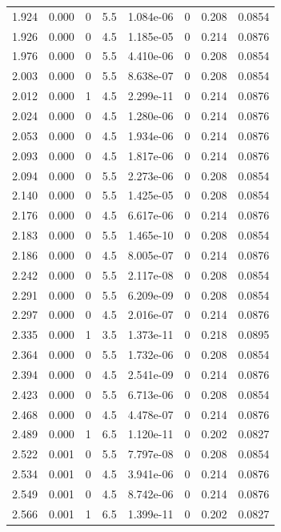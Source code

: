 \documentclass[preview]{standalone}
\begin{document}
{{{\begin{tabular}{L{1.2cm}C{1.2cm} C{0.3cm}C{0.5cm} C{1.4cm}C{1.4cm} C{1.4cm}C{1.4cm}}
  1.924  &  0.000  & 0     & 5.5 &  1.084e-06  & 0  & 0.208 &  0.0854   \\ 
  1.926  &  0.000  & 0     & 4.5 &  1.185e-05  & 0  & 0.214 &  0.0876   \\ 
  1.976  &  0.000  & 0     & 5.5 &  4.410e-06  & 0  & 0.208 &  0.0854   \\ 
  2.003  &  0.000  & 0     & 5.5 &  8.638e-07  & 0  & 0.208 &  0.0854   \\ 
  2.012  &  0.000  & 1     & 4.5 &  2.299e-11  & 0  & 0.214 &  0.0876   \\ 
  2.024  &  0.000  & 0     & 4.5 &  1.280e-06  & 0  & 0.214 &  0.0876   \\ 
  2.053  &  0.000  & 0     & 4.5 &  1.934e-06  & 0  & 0.214 &  0.0876   \\ 
  2.093  &  0.000  & 0     & 4.5 &  1.817e-06  & 0  & 0.214 &  0.0876   \\ 
  2.094  &  0.000  & 0     & 5.5 &  2.273e-06  & 0  & 0.208 &  0.0854   \\ 
  2.140  &  0.000  & 0     & 5.5 &  1.425e-05  & 0  & 0.208 &  0.0854   \\ 
  2.176  &  0.000  & 0     & 4.5 &  6.617e-06  & 0  & 0.214 &  0.0876   \\ 
  2.183  &  0.000  & 0     & 5.5 &  1.465e-10  & 0  & 0.208 &  0.0854   \\ 
  2.186  &  0.000  & 0     & 4.5 &  8.005e-07  & 0  & 0.214 &  0.0876   \\ 
  2.242  &  0.000  & 0     & 5.5 &  2.117e-08  & 0  & 0.208 &  0.0854   \\ 
  2.291  &  0.000  & 0     & 5.5 &  6.209e-09  & 0  & 0.208 &  0.0854   \\ 
  2.297  &  0.000  & 0     & 4.5 &  2.016e-07  & 0  & 0.214 &  0.0876   \\ 
  2.335  &  0.000  & 1     & 3.5 &  1.373e-11  & 0  & 0.218 &  0.0895   \\ 
  2.364  &  0.000  & 0     & 5.5 &  1.732e-06  & 0  & 0.208 &  0.0854   \\ 
  2.394  &  0.000  & 0     & 4.5 &  2.541e-09  & 0  & 0.214 &  0.0876   \\ 
  2.423  &  0.000  & 0     & 5.5 &  6.713e-06  & 0  & 0.208 &  0.0854   \\ 
  2.468  &  0.000  & 0     & 4.5 &  4.478e-07  & 0  & 0.214 &  0.0876   \\ 
  2.489  &  0.000  & 1     & 6.5 &  1.120e-11  & 0  & 0.202 &  0.0827   \\ 
  2.522  &  0.001  & 0     & 5.5 &  7.797e-08  & 0  & 0.208 &  0.0854   \\ 
  2.534  &  0.001  & 0     & 4.5 &  3.941e-06  & 0  & 0.214 &  0.0876   \\ 
  2.549  &  0.001  & 0     & 4.5 &  8.742e-06  & 0  & 0.214 &  0.0876   \\ 
  2.566  &  0.001  & 1     & 6.5 &  1.399e-11  & 0  & 0.202 &  0.0827   \\ 
\hline 
\end{tabular} 

}}}
\end{document}
